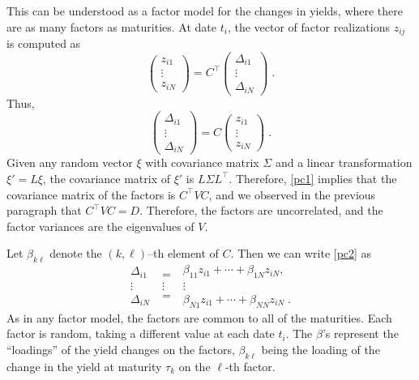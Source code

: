 This can be understood as a factor model  for the changes in yields, where there are as many factors as maturities.  At date $t_i$, the vector of factor realizations $z_{ij}$ is computed as
\begin{equation}\label{pc1}
\begin{pmatrix} z_{i1} \\ \vdots \\ z_{iN} \end{pmatrix} = C^\top \begin{pmatrix} \varDelta_{i1} \\ \vdots \\ \varDelta_{iN} \end{pmatrix}\;.
\end{equation}
Thus,
\begin{equation}\label{pc2}
\begin{pmatrix} \varDelta_{i1} \\ \vdots \\ \varDelta_{iN} \end{pmatrix}  
= C \begin{pmatrix} z_{i1} \\ \vdots \\ z_{iN} \end{pmatrix}\;.\end{equation}
Given any random vector $\xi$ with covariance matrix $\Sigma$ and a linear transformation $\xi' = L \xi$, the covariance matrix of $\xi'$ is $L\Sigma L^\top$.  Therefore, 
 \eqref{pc1} implies that the covariance matrix of the factors is $C^\top VC$, and we observed in the previous paragraph that $C^\top VC=D$.   Therefore, the factors are uncorrelated, and the factor variances are the eigenvalues of $V$.  

Let $\beta_{k\ell}$ denote the $(k,\ell)$--th element of $C$.  Then we can write \eqref{pc2} as
\begin{equation}\label{pc3}\begin{matrix} \varDelta_{i1} \\ \vdots \\ \varDelta_{iN} \end{matrix} 
\;\begin{matrix}= \\ \vdots \\ = \end{matrix}\;
\begin{matrix} \beta_{11}z_{i1} + \cdots + \beta_{1N}z_{iN}, \\ \vdots \\ \beta_{N1}z_{i1} + \cdots + \beta_{NN}z_{iN} \;.\end{matrix}\end{equation}
As in any factor model, the factors are common to all of the maturities.  Each factor is random, taking a different value at each date $t_i$.  The $\beta$'s represent the ``loadings''  of the yield changes on the factors, $\beta_{k\ell}$ being the loading of the change in the yield at maturity $\tau_k$ on the $\ell$-th factor.

